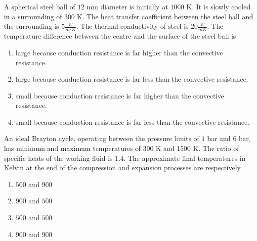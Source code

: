 \iffalse
                       
                        
                        
                        
                    
                        \author{AI24BTECH11006 - Bugada Roopansha}
                        \section{ME}
                        \chapter{2011}
                        \fi

    \item A spherical steel ball of $12$ mm diameter is initially at $1000$ K. It is slowly cooled in a surrounding of $300$ K. The heat transfer coefficient between the steel ball and the surrounding is $5 \frac{W}{m^2 K}$. The thermal conductivity of steel is $20 \frac{W}{mK}$. The temperature difference between the centre and the surface of the steel ball is
    \begin{enumerate}
        \item large because conduction resistance is far higher than the convective resistance.
        \item large because conduction resistance is far less than the convective resistance.
        \item small because conduction resistance is far higher than the convective resistance.
        \item small because conduction resistance is far less than the convective resistance.
    \end{enumerate}

    \item An ideal Brayton cycle, operating between the pressure limits of $1$ bar and $6$ bar, has minimum and maximum temperatures of $300$ K and $1500$ K. The ratio of specific heats of the working fluid is $1.4$. The approximate final temperatures in Kelvin at the end of the compression and expansion processes are respectively
    \begin{enumerate}
        \item $500$ and $900$
        \item $900$ and $500$
        \item $500$ and $500$
        \item $900$ and $900$
    \end{enumerate}

